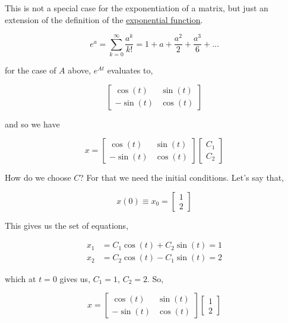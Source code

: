 \documentclass{article}
\begin{document}
\noindent This is not a special case for the exponentiation of a matrix, but just an extension of the definition of the \href{https://en.wikipedia.org/wiki/Exponential_function#Formal_definition}{exponential function}.

\begin{equation}
    e^a = \sum_{k=0}^{\infty} \frac{a^k}{k!} = 1 + a + \frac{a^2}{2} + \frac{a^3}{6} + \ldots{}
\end{equation}

\noindent for the case of $A$ above, $e^{At}$ evaluates to,

\begin{equation}
    \begin{bmatrix}
        \cos(t) & \sin(t) \\
        -\sin(t) & \cos(t)
    \end{bmatrix}
\end{equation}

\noindent and so we have

\begin{equation}
    x = \begin{bmatrix}
        \cos(t) & \sin(t) \\
        -\sin(t) & \cos(t)
    \end{bmatrix}
    \begin{bmatrix}
        C_1 \\
        C_2
    \end{bmatrix}
\end{equation}

\noindent How do we choose $C$? For that we need the initial conditions. Let's say that,

\begin{equation}
x(0) \equiv x_0 =
    \begin{bmatrix}
        1 \\
        2
    \end{bmatrix}
\end{equation}

\noindent This gives us the set of equations,

\begin{align}
    x_1 &= C_1 \cos(t) + C_2 \sin(t) = 1 \\
    x_2 &= C_2 \cos(t) - C_1 \sin(t) = 2
\end{align}

\noindent which at $t = 0$ gives us, $C_1 = 1$, $C_2 = 2$. So,

\begin{equation}
    x = \begin{bmatrix}
        \cos(t) & \sin(t) \\
        -\sin(t) & \cos(t)
    \end{bmatrix}
    \begin{bmatrix}
        1 \\
        2
    \end{bmatrix}
\end{equation}
\end{document}
